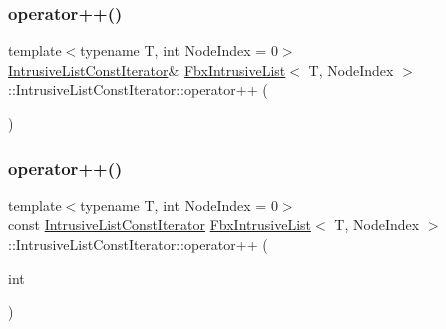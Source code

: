 \mbox{\label{class_fbx_intrusive_list_1_1_intrusive_list_const_iterator_acec5cc7484c22f7c9a75c98f1281397d}} 
\subsubsection{\texorpdfstring{operator++()}{operator++()}\hspace{0.1cm}{\footnotesize\ttfamily [1/2]}}
{\footnotesize\ttfamily template$<$typename T, int Node\+Index = 0$>$ \\
\hyperlink{class_fbx_intrusive_list_1_1_intrusive_list_const_iterator}{Intrusive\+List\+Const\+Iterator}\& \hyperlink{class_fbx_intrusive_list}{Fbx\+Intrusive\+List}$<$ T, Node\+Index $>$\+::Intrusive\+List\+Const\+Iterator\+::operator++ (\begin{DoxyParamCaption}{ }\end{DoxyParamCaption})}

\mbox{\label{class_fbx_intrusive_list_1_1_intrusive_list_const_iterator_a7bdf0ed9c35fae73e3998a09a209cf39}} 
\subsubsection{\texorpdfstring{operator++()}{operator++()}\hspace{0.1cm}{\footnotesize\ttfamily [2/2]}}
{\footnotesize\ttfamily template$<$typename T, int Node\+Index = 0$>$ \\
const \hyperlink{class_fbx_intrusive_list_1_1_intrusive_list_const_iterator}{Intrusive\+List\+Const\+Iterator} \hyperlink{class_fbx_intrusive_list}{Fbx\+Intrusive\+List}$<$ T, Node\+Index $>$\+::Intrusive\+List\+Const\+Iterator\+::operator++ (\begin{DoxyParamCaption}\item[{int}]{ }\end{DoxyParamCaption})}

